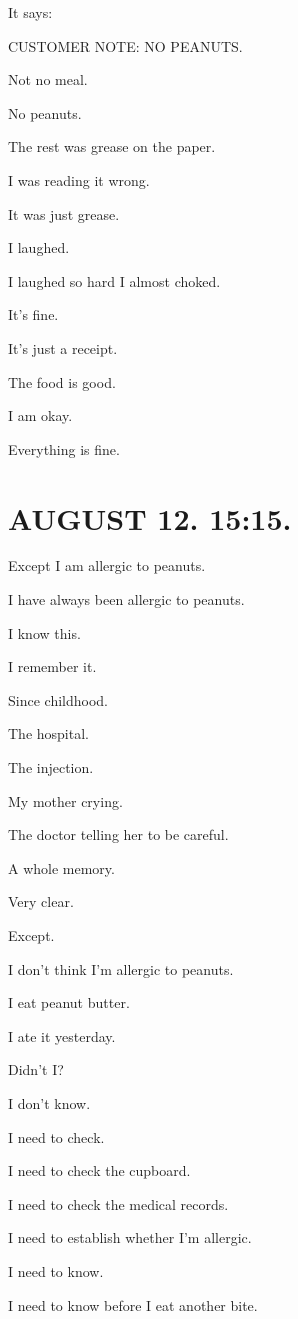 \documentclass[11pt,oneside]{book}
\begin{document}
It says:

CUSTOMER NOTE: NO PEANUTS.

Not no meal.

No peanuts.

The rest was grease on the paper.

I was reading it wrong.

It was just grease.

I laughed.

I laughed so hard I almost choked.

It's fine.

It's just a receipt.

The food is good.

I am okay.

Everything is fine.

\section*{AUGUST 12. 15:15.}

Except I am allergic to peanuts.

I have always been allergic to peanuts.

I know this.

I remember it.

Since childhood.

The hospital.

The injection.

My mother crying.

The doctor telling her to be careful.

A whole memory.

Very clear.

Except.

I don't think I'm allergic to peanuts.

I eat peanut butter.

I ate it yesterday.

Didn't I?

I don't know.

I need to check.

I need to check the cupboard.

I need to check the medical records.

I need to establish whether I'm allergic.

I need to know.

I need to know before I eat another bite.
\end{document}
